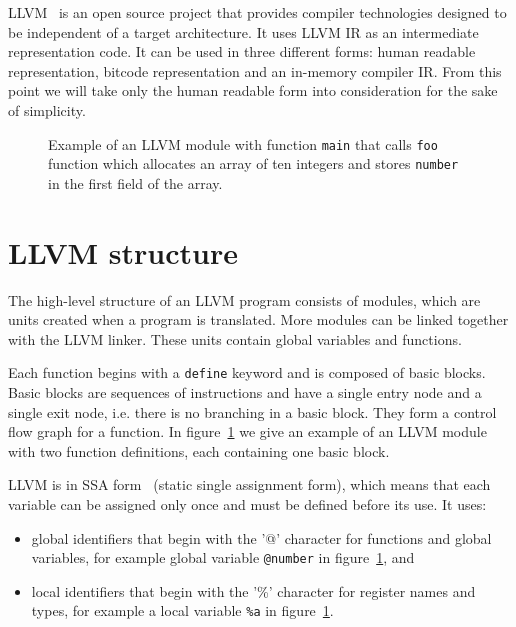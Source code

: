 LLVM~\cite{llvm} is an open source project that provides compiler technologies
designed to be independent of a target architecture. It uses LLVM IR as an
intermediate representation code. It can be used in three different forms:
human readable representation, bitcode representation and an in-memory compiler
IR. From this point we will take only the human readable form into
consideration for the sake of simplicity.

\begin{figure}[h]
 
 \caption{Example of an LLVM module with function \texttt{main} that calls
 \texttt{foo} function which allocates an array of ten integers and stores
 \texttt{number} in the first field of the array.}
 \label{fig:llvm_example}
\end{figure}

\section{LLVM structure} %

The high-level structure of an LLVM program consists of modules, which are
units created when a program is translated. More modules can be linked together
with the LLVM linker. These units contain global variables and functions.

Each function begins with a \texttt{define} keyword and is composed of basic
blocks. Basic blocks are sequences of instructions and have a single entry node
and a single exit node, i.e. there is no branching in a basic block. They form
a control flow graph for a function. In figure~\ref{fig:llvm_example} we give
an example of an LLVM module with two function definitions, each containing one
basic block.

LLVM is in SSA form~\cite{ssa} (static single assignment form), which means that each
variable can be assigned only once and must be defined before its use. It uses:

\begin{itemize}
    \item global identifiers that begin with the '@' character for functions
    and global variables, for example global variable \texttt{@number} in
    figure~\ref{fig:llvm_example}, and
    \item local identifiers that begin with the '\%' character for register
    names and types, for example a local variable \texttt{\%a} in
    figure~\ref{fig:llvm_example}.
\end{itemize}

